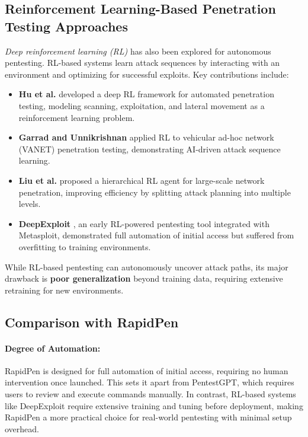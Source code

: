 \subsection{Reinforcement Learning-Based Penetration Testing Approaches}

\textit{Deep reinforcement learning (RL)} has also been explored for autonomous pentesting. RL-based systems learn attack sequences by interacting with an environment and optimizing for successful exploits. Key contributions include:
\begin{itemize}
    \item \textbf{Hu et al.} \cite{hu2020deeprl} developed a deep RL framework for automated penetration testing, modeling scanning, exploitation, and lateral movement as a reinforcement learning problem.
    \item \textbf{Garrad and Unnikrishnan} \cite{garrad2023vanet} applied RL to vehicular ad-hoc network (VANET) penetration testing, demonstrating AI-driven attack sequence learning.
    \item \textbf{Liu et al.} \cite{liu2024hierarchical} proposed a hierarchical RL agent for large-scale network penetration, improving efficiency by splitting attack planning into multiple levels.
    \item \textbf{DeepExploit} \cite{takaesu2018deepexploit,deepexploit2019}, an early RL-powered pentesting tool integrated with Metasploit, demonstrated full automation of initial access but suffered from overfitting to training environments.
\end{itemize}
While RL-based pentesting can autonomously uncover attack paths, its major drawback is \textbf{poor generalization} beyond training data, requiring extensive retraining for new environments.

\subsection{Comparison with RapidPen}

\paragraph{Degree of Automation:} RapidPen is designed for full automation of initial access, requiring no human intervention once launched. This sets it apart from PentestGPT, which requires users to review and execute commands manually. In contrast, RL-based systems like DeepExploit require extensive training and tuning before deployment, making RapidPen a more practical choice for real-world pentesting with minimal setup overhead.

